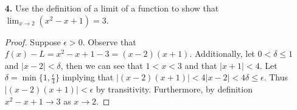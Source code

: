 \documentclass[ 12pt ]{article}
\begin{document}
\begin{enumerate}
	\item[\textbf{4.}] Use the definition of a limit of a function to show that $\lim_{x \rightarrow 2}(x^2 - x + 1) = 3$.

	\begin{proof}
		Suppose $\epsilon > 0$. Observe that $f(x) - L = x^2 - x + 1 - 3 = (x-2)(x+1)$. Additionally, let $0 < \delta \leq 1$ and $|x-2| < \delta$, then we can see
		that $1 < x < 3$ and that $|x+1| < 4$. Let $\delta = \min\{1, \frac{\epsilon}{4}\}$ implying that $|(x-2)(x+1)| < 4|x-2| < 4\delta \leq \epsilon$. Thus
		$|(x-2)(x+1)| < \epsilon$ by transitivity. Furthermore, by definition $x^2 - x + 1 \rightarrow 3$ as $x \rightarrow 2$.
	\end{proof}
\end{enumerate}
\end{document}
